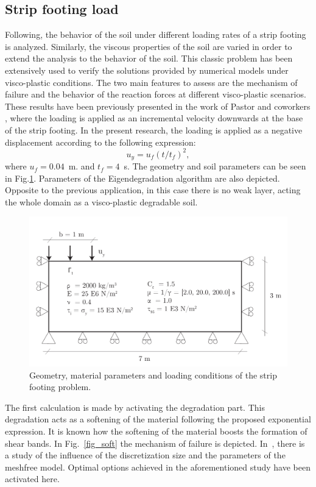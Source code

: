 \documentclass[applsci,journal,article,submit,moreauthors,pdftex]{Definitions/mdpi}
\begin{document}
\subsection{Strip footing load}
\label{S42}
Following, the behavior of the soil under different loading rates of a strip footing is analyzed. Similarly, the viscous properties of the soil are varied in order to extend the analysis to the behavior of the soil. This classic problem has been extensively used to verify the solutions provided by numerical models under visco-plastic conditions. The two main features to assess are the mechanism of failure and the behavior of the reaction forces at different visco-plastic scenarios. These results have been previously presented in the work of Pastor and coworkers \cite{BlancPastor2012,Navas2018}, where the loading is applied as an incremental velocity downwards at the base of the strip footing. In the present research, the loading is applied as a negative displacement according to the following expression: $$u_y=u_f\left(t/t_f\right)^2,$$ 
where $u_f=0.04$~m. and $t_f=4$~s. The geometry and soil parameters can be seen in Fig.\ref{fig_geozap}. Parameters of the Eigendegradation algorithm are also depicted. Opposite to the previous application, in this case there is no weak layer, acting the whole domain as a visco-plastic degradable soil.

\begin{figure}[!t]
\begin{center}
\includegraphics[width=12cm]{Figs/geo_zap.pdf}
\caption{Geometry, material parameters and loading conditions of the strip footing problem.}
\label{fig_geozap}
\end{center}
\end{figure}

The first calculation is made by activating the degradation part. This degradation acts as a softening of the material following the proposed exponential expression. It is known how the softening of the material boosts the formation of shear bands. In Fig.~\ref{fig_soft} the mechanism of failure is depicted. In~\cite{Navas2018}, there is a study of the influence of the discretization size and the parameters of the meshfree model. Optimal options achieved in the aforementioned study have been activated here.
\end{document}
